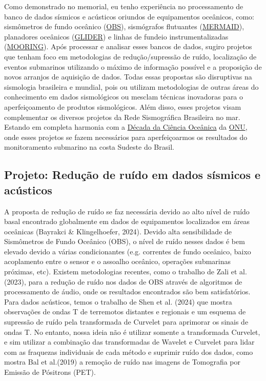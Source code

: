\documentclass[10pt,a4paper,oneside]{book}
\begin{document}
Como demonstrado no memorial, eu tenho experiência no processamento de banco de dados sísmicos e acústicos oriundos de equipamentos oceânicos, como: sismômetros de fundo oceânico (\href{https://en.wikipedia.org/wiki/Ocean-bottom_seismometer}{OBS}), sismógrafos flutuantes (\href{https://www.geoazur.fr/GLOBALSEIS/Mermaid.html}{MERMAID}), planadores oceânicos (\href{https://oceanservice.noaa.gov/facts/ocean-gliders.html}{GLIDER}) e  linhas de fundeio instrumentalizadas (\href{https://oceanobservatories.org/moorings/#:~:text=Mooring\%20lines\%20may\%20consist\%20of,down\%20along\%20the\%20mooring\%20line.l}{MOORING}). Após processar e analisar esses bancos de dados, sugiro projetos que tenham foco em metodologias de redução/supressão de ruído, localização de eventos submarinos utilizando o máximo de informação possível e a proposição de novos arranjos de aquisição de dados. Todas essas propostas são disruptivas na sismologia brasileira e mundial, pois ou utilizam metodologias de outras áreas do conhecimento em dados sismológicos ou mesclam técnicas inovadoras para o aperfeiçoamento de produtos sismológicos. Além disso, esses projetos visam complementar os diversos projetos da Rede Sismográfica Brasileira no mar. Estando em completa harmonia com a \href{https://decada.ciencianomar.mctic.gov.br/}{Década da Ciência Oceânica} da \href{https://brasil.un.org/pt-br}{ONU}, onde esses projetos se fazem necessários para aperfeiçoarmos os resultados do monitoramento submarino na costa Sudeste do Brasil.

\subsection{Projeto: Redução de ruído em dados sísmicos e acústicos}

A proposta de redução de ruído se faz necessária devido ao alto nível de ruído basal encontrado globalmente em dados de equipamentos localizados em áreas oceânicas (Bayrakci \& Klingelhoefer, 2024). Devido alta sensibilidade de Sismômetros de Fundo Oceânico (OBS), o nível de ruído nesses dados é bem elevado devido a várias condicionantes (e.g. correntes de fundo oceânico, baixo acoplamento entre o sensor e o assoalho oceânico, operações submarinas próximas, etc). Existem metodologias recentes, como o trabalho de Zali et al. (2023), para a redução de ruído nos dados de OBS através de algoritmos de processamento de áudio, onde os resultados encontrados são bem satisfatórios. Para dados acústicos, temos o trabalho de Shen et al. (2024) que mostra observações de ondas T de terremotos distantes e regionais e um esquema de supressão de ruído pela transformada de Curvelet para aprimorar os sinais de ondas T. No entanto, nossa ideia não é utilizar somente a transformada Curvelet, e sim utilizar a combinação das transformadas de Wavelet e Curvelet para lidar com as fraquezas individuais de cada método e suprimir ruído dos dados, como mostra Bal et al.(2019) a remoção de ruído nas imagens de Tomografia por Emissão de Pósitrons (PET).
\end{document}

